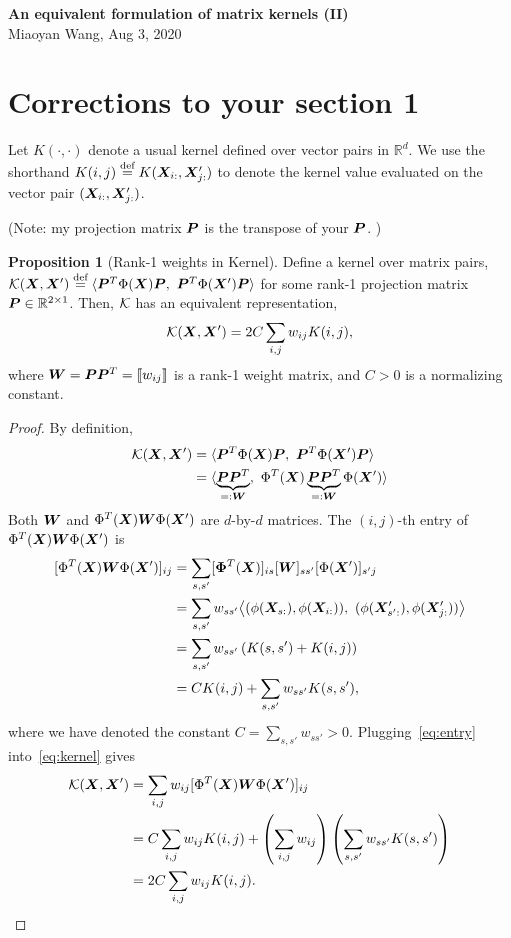 \documentclass[11pt]{article}
\theoremstyle{plain}
\theoremstyle{definition}
\newtheorem{prop}{Proposition}
\newcommand*{\KeepStyleUnderBrace}[1]{%
  \mathop{%
    \mathchoice
    {\underbrace{\displaystyle#1}}%
    {\underbrace{\textstyle#1}}%
    {\underbrace{\scriptstyle#1}}%
    {\underbrace{\scriptscriptstyle#1}}%
  }\limits
}
\begin{document}
\begin{center}
{\bf \Large An equivalent formulation of matrix kernels (II)}\\
Miaoyan Wang, Aug 3, 2020\\
\end{center}

\section{Corrections to your section 1}
Let $K(\cdot,\cdot)$ denote a usual kernel defined over vector pairs in $\mathbb{R}^d$. We use the shorthand $K(i,j)\stackrel{\text{def}}{=}K(\bm X_{i:}, \bm X'_{j:})$ to denote the kernel value evaluated on the vector pair $(\bm X_{i:}, \bm X'_{j:})$. 

(Note: my projection matrix $\bm{P}$ is the transpose of your $\bm{P}$. )
\begin{prop}[Rank-1 weights in Kernel]\label{pro:kernel}
Define a kernel over matrix pairs, $\mathcal{K}(\bm X,\bm X')\stackrel{\text{def}}{=}\langle \bm{P}^T\Phi(\bm X)\bm{P},\ \bm{P}^T\Phi(\bm X')\bm{P}\rangle$ for some rank-1 projection matrix $\bm{P}\in\mathbb{R}^{2\times 1}$. Then, $\mathcal{K}$ has an equivalent representation,
\begin{equation}\label{eq:rank1}
\mathcal{K}(\bm X,\bm X') = 2C \sum_{i,j}w_{ij}K(i, j),
\end{equation}
where $\bm{W}=\bm{P}\bm{P}^T=\llbracket w_{ij} \rrbracket$ is a rank-1 weight matrix, and $C>0$ is a normalizing constant. 
\end{prop}

\begin{proof} By definition,
\begin{align}\label{eq:kernel}
\tK(\mX, \mX')&=\langle \mP^T\Phi(\mX)\mP,\ \mP^T\Phi(\mX')\mP\rangle \notag\\
&= \langle \KeepStyleUnderBrace{\mP\mP^T}_{=:\mW},\ \Phi^T(\mX)\KeepStyleUnderBrace{\mP\mP^T}_{=:\mW}\Phi(\mX')\rangle
\end{align}
Both $\bm{W}$ and $\Phi^T(\bm X)\bm{W}\Phi(\bm X')$ are $d$-by-$d$ matrices. The $(i,j)$-th entry of $\Phi^T(\bm X)\bm{W}\Phi(\bm X')$ is
\begin{align}\label{eq:entry}
[\Phi^T(\bm X)\bm{W}\Phi(\bm X')]_{ij}&=\sum_{s,s'} [\boldsymbol{\Phi}^T(\bm X)]_{is}[\bm{W}]_{ss'}[\Phi(\bm X')]_{s'j}\notag\\
&=\sum_{s,s'}w_{ss'}\big\langle ( \phi(\bm X_{s:}),  \phi(\bm X_{i:})  ),\  (\phi(\bm X'_{s':}),  \phi(\bm X'_{j:})  )\big\rangle\notag\\
&=\sum_{s,s'}w_{ss'}\left(K(s,s')+K(i,j)\right)\notag\\
&=CK(i,j)+\sum_{s,s'}w_{ss'}K(s,s'),
\end{align}
where we have denoted the constant $C=\sum_{s,s'}w_{ss'}>0$. Plugging~\eqref{eq:entry} into~\eqref{eq:kernel} gives
\begin{align}
\mathcal{K}(\bm X, \bm X') &=\sum_{i,j}w_{ij}  [\Phi^T(\bm X)\bm{W}\Phi(\bm X')]_{ij}\\
&=C \sum_{i,j}w_{ij}K(i,j)+\left(\sum_{i,j}w_{ij}\right)\left(\sum_{s,s'}w_{ss'}K(s,s')\right)\\
&=2C\sum_{i,j}w_{ij}K(i,j).
\end{align} 
\end{proof}
\end{document}
